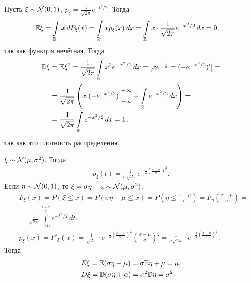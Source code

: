 \documentclass[../main.tex]{subfiles}
\begin{document}
\begin{exmpl}
 Пусть $ \xi \sim \mathcal N(0,1) $,  $ p_\xi = \frac{1}{\sqrt{2\pi}}e^{-t^{2} / 2} $. Тогда
 \begin{align*}
  \mathbb E\xi &= \int\limits_{\mathbb{R}} x\,dP_\xi(x) = \int\limits_{\mathbb{R}} x p_\xi(x)\,dx = \int\limits_{\mathbb{R}} x \cdot \frac{1}{\sqrt{2\pi}}      e^{-x^{2} / 2}\,dx = 0,
 \end{align*} так как функция нечётная. Тогда
 \begin{align*}
  \mathbb D\xi &= \mathbb E\xi^{2} = \frac{1}{\sqrt{2\pi}}\int\limits_{\mathbb{R}} x^{2} e^{-x^{2} / 2}\,dx = [xe^{-\frac{x}{2}} = (-e^{-x^{2} / 2})'] = \\
  &= \frac{1}{\sqrt{2\pi}} \left( x \left.(-e^{-x^{2} / 2})\right|_{-\infty}^{+\infty} + \int\limits_{\mathbb{R}} e^{-x^{2} / 2}\,dx  \right) = \\
   &= \frac{1}{\sqrt{2\pi}} \int\limits_{\mathbb{R}} e^{-x^{2} / 2} \,dx = 1,
 \end{align*} так как это плотность распределения.
\end{exmpl}
 
\begin{exmpl}
 $ \xi \sim \mathcal N(\mu,\sigma^{2}) $. Тогда
 \begin{align*}
  p_\xi(t) = \frac{1}{\sigma\sqrt{2\pi}} e^{-\frac{1}{2} \left( \frac{x-\mu}{\sigma} \right)^{2}}.
 \end{align*} Если $ \eta \sim \mathcal N(0,1) $, то $ \xi = \sigma \eta + a \sim \mathcal N(\mu,\sigma^{2}) $.
\begin{align*}
 &F_\xi(x) = P(\xi \leqslant x) = P(\sigma\eta + \mu \leqslant x) = P\left(\eta \leqslant \frac{x-\mu}{\sigma}\right) = F_{\eta}\left( \frac{x-\mu}{\sigma} \right) = \\
 &= \frac{1}{\sqrt{2\pi}} \int\limits_{-\infty}^{\frac{x-\mu}{\sigma}} e^{-t^{2} / 2}\,dt. \\
 &p_\xi(x) = F'_\xi(x) = \frac{1}{\sqrt{2\pi}} \cdot e^{-\frac{1}{2} \left( \frac{x-\mu}{\sigma} \right)^{2}} \left( \frac{x-\mu}{\sigma} \right)' = \frac{1}{\sigma\sqrt{2\pi}} \cdot e^{-\frac{1}{2} \left( \frac{x-\mu}{\sigma} \right)^{2}}.
\end{align*} Тогда
\begin{align*}
 &E\xi = \mathbb E(\sigma \eta + \mu)  = \sigma \mathbb E\eta + \mu = \mu.\\
 &D\xi = \mathbb D(\sigma\eta + a) = \sigma^{2}\mathbb D\eta = \sigma^{2}.
\end{align*} 
\end{exmpl}
\end{document}
